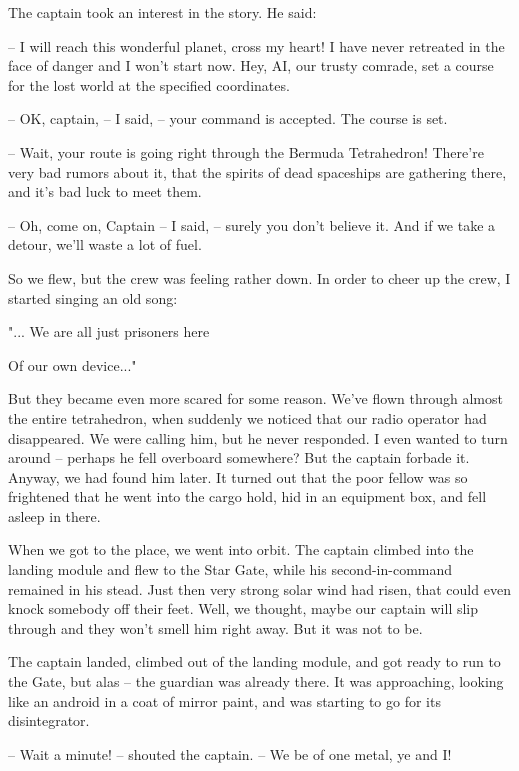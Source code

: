 \documentclass[ebook,twoside,final,openright]{memoir}
\begin{document}
\par
The captain took an interest in the story. He said:\par
– I will reach this wonderful planet, cross my heart! I have never retreated in the face of danger and I won’t start now. Hey, AI, our trusty comrade, set a course for the lost world at the specified coordinates.\par
– OK, captain, – I said, – your command is accepted. The course is set.\par
– Wait, your route is going right through the Bermuda Tetrahedron! There’re very bad rumors about it, that the spirits of dead spaceships are gathering there, and it’s bad luck to meet them.\par
– Oh, come on, Captain – I said, – surely you don’t believe it. And if we take a detour, we’ll waste a lot of fuel.\par
\par
So we flew, but the crew was feeling rather down. In order to cheer up the crew, I started singing an old song: \par
 "... We are all just prisoners here \par
 Of our own device..." \par
 But they became even more scared for some reason. We’ve flown through almost the entire tetrahedron, when suddenly we noticed that our radio operator had disappeared. We were calling him, but he never responded. I even wanted to turn around – perhaps he fell overboard somewhere? But the captain forbade it. Anyway, we had found him later. It turned out that the poor fellow was so frightened that he went into the cargo hold, hid in an equipment box, and fell asleep in there.\par
\par
When we got to the place, we went into orbit. The captain climbed into the landing module and flew to the Star Gate, while his second-in-command remained in his stead. Just then very strong solar wind had risen, that could even knock somebody off their feet. Well, we thought, maybe our captain will slip through and they won’t smell him right away. But it was not to be.\par
\par
The captain landed, climbed out of the landing module, and got ready to run to the Gate, but alas – the guardian was already there. It was approaching, looking like an android in a coat of mirror paint, and was starting to go for its disintegrator.\par
– Wait a minute! – shouted the captain. – We be of one metal, ye and I!\par
\end{document}
